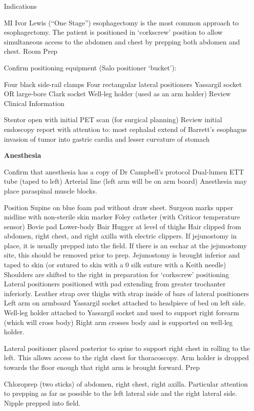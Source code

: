 \documentclass[
]{book}
\begin{document}
Indications

MI Ivor Lewis (``One Stage'') esophagectomy is the most common approach to esophagectomy. The patient is positioned in `corkscrew' position to allow simultaneous access to the abdomen and chest by prepping both abdomen and chest. Room Prep

Confirm positioning equipment (Salo positioner `bucket'):

Four black side-rail clamps
Four rectangular lateral positioners
Yassargil socket OR large-bore Clark socket
Well-leg holder (used as an arm holder)
Review Clinical Information

Stentor open with initial PET scan (for surgical planning)
Review initial endoscopy report with attention to:
most cephalad extend of Barrett's esophagus
invasion of tumor into gastric cardia and lesser curvature of stomach

\textbf{Anesthesia}

Confirm that anesthesia has a copy of Dr Campbell's protocol
Dual-lumen ETT tube (taped to left)
Arterial line (left arm will be on arm board)
Anesthesia may place paraspinal muscle blocks.

Position
Supine on blue foam pad without draw sheet. Surgeon marks upper midline with non-sterile skin marker Foley catheter (with Criticor temperature sensor) Bovie pad Lower-body Bair Hugger at level of thighs Hair clipped from abdomen, right chest, and right axilla with electric clippers. If jejunostomy in place, it is usually prepped into the field. If there is an eschar at the jejunostomy site, this should be removed prior to prep. Jejunostomy is brought inferior and taped to skin (or sutured to skin with a 0 silk suture with a Keith needle) Shoulders are shifted to the right in preparation for `corkscrew' positioning Lateral positioners positioned with pad extending from greater trochanter inferiorly. Leather strap over thighs with strap inside of bars of lateral positioners Left arm on armboard Yassargil socket attached to headpiece of bed on left side. Well-leg holder attached to Yassargil socket and used to support right forearm (which will cross body) Right arm crosses body and is supported on well-leg holder.

Lateral positioner placed posterior to spine to support right chest in rolling to the left. This allows access to the right chest for thoracoscopy. Arm holder is dropped towards the floor enough that right arm is brought forward. Prep

Chloroprep (two sticks) of abdomen, right chest, right axilla. Particular attention to prepping as far as possible to the left lateral side and the right lateral side. Nipple prepped into field.
\end{document}
